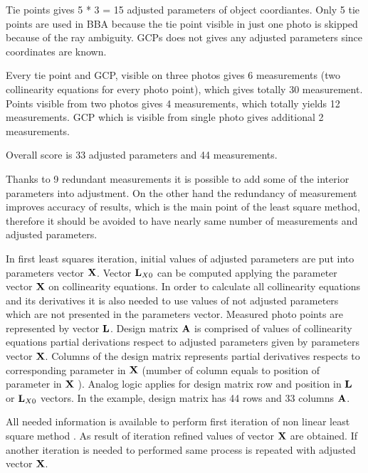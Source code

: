 \documentclass[a4paper,12pt]{article}
\newcommand{\ematr}[1]{
{\bf #1}
}
\newcommand{\evect}[1]{
{\bf #1}
}
\begin{document}
Tie points gives 5 * 3 = 15 adjusted parameters of object coordiantes. 
Only 5 tie points are used in BBA because the tie point visible in just one photo is skipped because of the ray ambiguity.
GCPs does not gives any adjusted parameters since coordinates are known.

Every tie point and GCP, visible on three photos gives 6 measurements (two collinearity equations for every photo point),
which gives totally 30 measurement.
Points visible from two photos gives 4 measurements, which totally yields 12 measurements.
GCP which is visible from single photo gives additional 2 measurements.

Overall score is 33 adjusted parameters and 44 measurements.

Thanks to 9 redundant measurements it is possible to add some of the interior parameters into adjustment.  
On the other hand the redundancy of measurement improves accuracy of results, which is the main point of the least square method,
therefore it should be avoided to have nearly same number of measurements and adjusted parameters.

In first least squares iteration, initial values of adjusted parameters are put into parameters vector $\evect{X}$. 
Vector $\evect{L}_{X0}$ can be computed applying the parameter vector $\evect{X}$ on collinearity
equations. In order to calculate all collinearity equations and its derivatives it is also needed to 
use values of not adjusted parameters which are not presented in the parameters vector.
Measured photo points are represented by vector $\evect{L}$.
Design matrix $\ematr{A}$ is comprised of values of  collinearity equations partial derivations respect to adjusted parameters
given by parameters vector $\evect{X}$. Columns of the design matrix represents partial derivatives 
respects to corresponding parameter  in  $\evect{X}$  (mumber of column equals to position of parameter in  $\evect{X}$ ).
Analog logic applies for design matrix row and position in $\evect{L}$ or $\evect{L}_{X0}$ vectors.
In the example, design matrix has 44 rows and 33 columns $\ematr{A}$.




All needed information is available to perform first iteration of non linear least square 
method \label{sec:non_least}. As result of iteration refined values of vector  $\evect{X}$
are obtained. If another iteration is needed to performed same process is repeated 
with adjusted vector $\evect{X}$.
\end{document}
